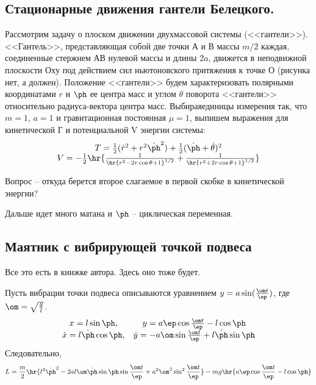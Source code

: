 \documentclass[a4paper,12pt]{article}
\begin{document}
\subsection{Стационарные движения гантели Белецкого.}
 Рассмотрим задачу о плоском движении двухмассовой системы
 (<<гантели>>). <<Гантель>>, представляющая собой две точки А и В
 массы $m/2$ каждая, соединенные стержнем $АВ$ нулевой массы и длины
 $2a$, движется в неподвижной плоскости $Оху$ под действием сил
 ньютоновского притяжения к точке О (рисунка нет, а должен). Положение
 <<гантели>> будем характеризовать полярными координатами $r$ и $\ph$
 ее центра масс и углом $\theta$ поворота <<гантели>> относительно
 радиуса-вектора центра масс. Выбираяединицы измерения так, что $m = 1$,
 $a = 1$ и гравитационная постоянная $\mu=1$, выпишем выражения для
 кинетической Г и потенциальной V энергии системы:
 \begin{displaymath}
   \begin{array}{c}
     T = \half({\dot r}^2+r^2{\dot\ph}^2)+\half(\dot\ph+\dot\theta)^2\\
     V = -\half\hr{\frac{1}{\hr{r^2 - 2r\cos\theta+1}^{1/2}} +\frac{1}{\hr{r^2 + 2r\cos\theta+1}^{1/2}}}
   \end{array}
 \end{displaymath}
 \begin{petit}
   Вопрос -- откуда берется второе слагаемое в первой скобке в кинетической энергии?
 \end{petit}
 \begin{petit}
   Дальше идет много матана и $\ph$ -- циклическая переменная.
 \end{petit}
\subsection{Маятник с вибрирующей точкой подвеса}
\begin{petit}
  Все это есть в книжке автора. Здесь оно тоже будет.
\end{petit}
Пусть вибрации точки подвеса описываются уравнением $y =
a\sin(\frac{\om t}{\ep})$, где $\om = \sqrt\frac{g}{l}$.
\newcommand{\hzz}{\frac{\om t}{\ep}}
\begin{displaymath}
  \begin{array}{cc}
    x = l \sin\ph,&  y = a\ep\cos\hzz -  l\cos\ph\\
    \dot x = l \dot\ph\cos\ph,& \dot y  =  -a\om\sin\hzz + l\dot\ph\sin\ph
  \end{array}
\end{displaymath}
Следовательно,
\begin{displaymath}
  L = \frac{m}{2}\hr{l^2{\dot\ph}^2 - 2al\om\dot\ph\sin\ph\sin\hzz + a^2\om^2\sin^2\hzz} - mg\hr{a\ep\cos\hzz - l\cos\ph}
\end{displaymath}
\end{document}
